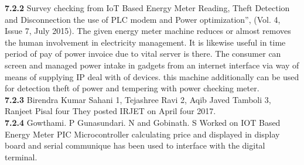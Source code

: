 \documentclass[12pt,a4paper]{article}
\begin{document}
\hspace{0.2cm} \textbf{7.2.2} Survey checking from IoT Based Energy Meter Reading, Theft Detection and Disconnection the use of PLC modem and Power optimization”, (Vol. 4, Issue 7, July 2015). The given energy meter machine reduces or almost removes the human involvement in electricity management. It is likewise useful in time period of pay of power invoice due to vital server is there. The consumer can screen and managed power intake in gadgets from an internet interface via way of means of supplying IP deal with of devices. this machine additionally can be used for detection theft of power and tempering with power checking meter.\\

\hspace{0.2cm} \textbf{7.2.3} Birendra Kumar Sahani 1, Tejashree Ravi 2, Aqib Javed Tamboli 3, Ranjeet Pisal four
They posted IRJET on April four 2017.\\

\hspace{0.2cm} \textbf{7.2.4} Gowthami. P Gunasundari. N and Gobinath. S Worked on IOT Based Energy Meter PIC Microcontroller calculating price and displayed in display board and serial communique has been used to interface with the digital terminal.
\end{document}
